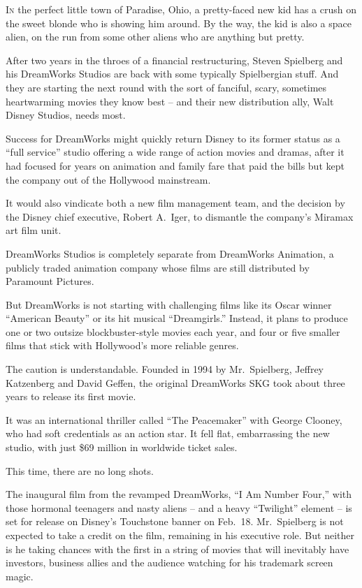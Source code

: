 ﻿\documentclass[12pt]{article}
\begin{document}
\lettrine{I}{n} the perfect little town of Paradise, Ohio, a pretty-faced
new kid has a crush on the sweet blonde who is showing him around. By the way, the kid is also a
space alien, on the run from some other aliens who are anything but pretty.

After two years in the throes of a financial restructuring, Steven Spielberg and his DreamWorks
Studios are back with some typically Spielbergian stuff. And they are starting the next round with
the sort of fanciful, scary, sometimes heartwarming movies they know best -- and their new
distribution ally, Walt Disney Studios, needs most.

Success for DreamWorks might quickly return Disney to its former status as a ``full service'' studio
offering a wide range of action movies and dramas, after it had focused for years on animation and
family fare that paid the bills but kept the company out of the Hollywood mainstream.

It would also vindicate both a new film management team, and the decision by the Disney chief
executive, Robert A.~Iger, to dismantle the company's Miramax art film unit.

DreamWorks Studios is completely separate from DreamWorks Animation, a publicly traded animation
company whose films are still distributed by Paramount Pictures.

But DreamWorks is not starting with challenging films like its Oscar winner ``American Beauty'' or
its hit musical ``Dreamgirls.'' Instead, it plans to produce one or two outsize blockbuster-style
movies each year, and four or five smaller films that stick with Hollywood's more reliable genres.

The caution is understandable. Founded in 1994 by Mr.~Spielberg, Jeffrey Katzenberg and David
Geffen, the original DreamWorks SKG took about three years to release its first movie.

It was an international thriller called ``The Peacemaker'' with George Clooney, who had soft
credentials as an action star. It fell flat, embarrassing the new studio, with just \$69 million in
worldwide ticket sales.

This time, there are no long shots.

The inaugural film from the revamped DreamWorks, ``I Am Number Four,'' with those hormonal teenagers
and nasty aliens -- and a heavy ``Twilight'' element -- is set for release on Disney's Touchstone
banner on Feb.~18. Mr.~Spielberg is not expected to take a credit on the film, remaining in his
executive role. But neither is he taking chances with the first in a string of movies that will
inevitably have investors, business allies and the audience watching for his trademark screen magic.
\end{document}
